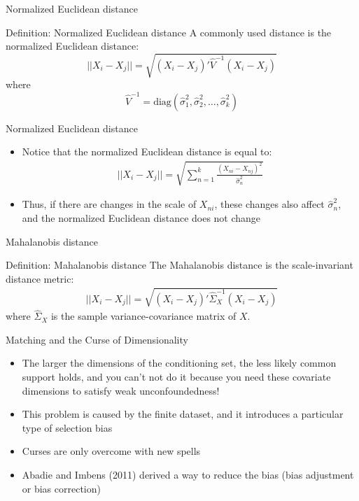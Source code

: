 \documentclass{beamer}
\begin{document}
\begin{frame}{Normalized Euclidean distance}

	\begin{block}{Definition: Normalized Euclidean distance}
	  A commonly used distance is the normalized Euclidean distance:$$||X_i-X_j|| = \sqrt{ (X_i-X_j)'\widehat{V}^{-1}(X_i - X_j) }$$ where
		$$\widehat{V}^{-1} = \text{diag}(\widehat{\sigma}_1^2, \widehat{\sigma}_2^2, \dots, \widehat{\sigma}_k^2)$$
	\end{block}
\end{frame}

\begin{frame}{Normalized Euclidean distance}
	\begin{itemize}
	\item Notice that the normalized Euclidean distance is equal to:
		\begin{eqnarray*}
		||X_i - X_j|| = \sqrt{\sum_{n=1}^k \frac{(X_{ni} - X_{nj})^2}{\widehat{\sigma}^2_n}}
		\end{eqnarray*}
	\item Thus, if there are changes in the scale of $X_{ni}$, these changes also affect $\widehat{\sigma}^2_n$, and the normalized Euclidean distance does not change
	\end{itemize}

\end{frame}


\begin{frame}{Mahalanobis distance}
	
	\begin{block}{Definition: Mahalanobis distance}
	The Mahalanobis distance is the scale-invariant distance metric:
		\begin{eqnarray*}
		||X_i-X_j|| = \sqrt{ (X_i-X_j)'\widehat{\Sigma}_X^{-1}(X_i - X_j) }
		\end{eqnarray*}
	where $\widehat{\Sigma}_X$ is the sample variance-covariance matrix of $X$.
	\end{block}


\end{frame}



\begin{frame}{Matching and the Curse of Dimensionality}
	
\begin{itemize}
\item The larger the dimensions of the conditioning set, the less likely common support holds, and you can't not do it because you need these covariate dimensions to satisfy weak unconfoundedness!
\item This problem is caused by the finite dataset, and it introduces a particular type of selection bias
\item Curses are only overcome with new spells  
\item Abadie and Imbens (2011) derived a way to reduce the bias (bias adjustment or bias correction)
\end{itemize}

\end{frame}
\end{document}
